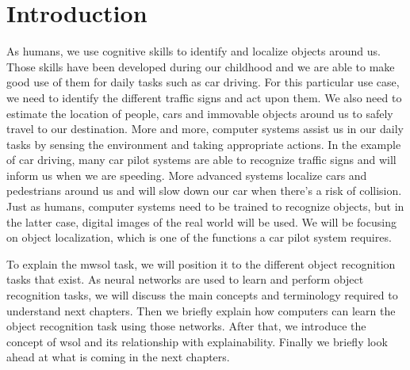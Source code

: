 \chapter{Introduction}

As humans, we use cognitive skills to identify and localize objects around us. Those skills have been developed during our childhood and we are able to make good use of them for daily tasks such as car driving. For this particular use case, we need to identify the different traffic signs and act upon them. We also need to estimate the location of people, cars and immovable objects around us to safely travel to our destination. More and more, computer systems assist us in our daily tasks by sensing the environment and taking appropriate actions. In the example of car driving, many car pilot systems are able to recognize traffic signs and will inform us when we are speeding. More advanced systems localize cars and pedestrians around us and will slow down our car when there's a risk of collision. Just as humans, computer systems need to be trained to recognize objects, but in the latter case, digital images of the real world will be used. We will be focusing on object localization, which is one of the functions a car pilot system requires.

To explain the \acrfull{mwsol} task, we will position it to the different object recognition tasks that exist. As neural networks are used to learn and perform object recognition tasks, we will discuss the main concepts and terminology required to understand next chapters. Then we briefly explain how computers can learn the object recognition task using those networks. After that, we introduce the concept of \acrlong{wsol} and its relationship with explainability. Finally we briefly look ahead at what is coming in the next chapters.

